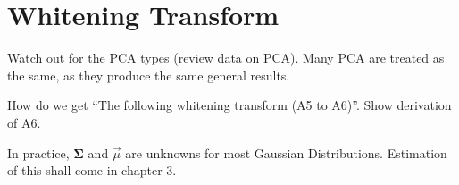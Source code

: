 \section{Whitening Transform}
Watch out for the PCA types (review data on PCA).  Many PCA are treated as the same, as they produce the same general results.  

How do we get ``The following whitening transform (A5 to A6)''.  Show derivation of A6.  

In practice, $\mathbf{\Sigma}$ and $\vec{\mu}$ are unknowns for most Gaussian Distributions.  Estimation of this shall come in chapter 3.  